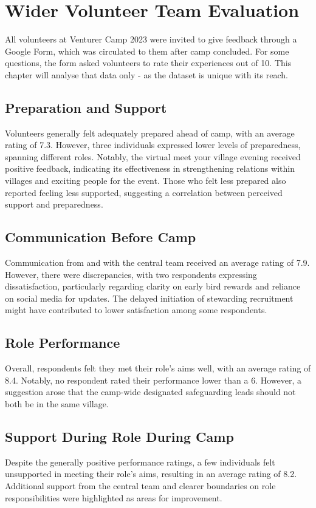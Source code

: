 \chapter{Wider Volunteer Team Evaluation}

All volunteers at Venturer Camp 2023 were invited to give feedback through a Google Form, which was circulated to them after camp concluded. For some questions, the form asked volunteers to rate their experiences out of 10. This chapter will analyse that data only - as the dataset is unique with its reach.

\section{Preparation and Support}
Volunteers generally felt adequately prepared ahead of camp, with an average rating of 7.3. However, three individuals expressed lower levels of preparedness, spanning different roles. Notably, the virtual meet your village evening received positive feedback, indicating its effectiveness in strengthening relations within villages and exciting people for the event. Those who felt less prepared also reported feeling less supported, suggesting a correlation between perceived support and preparedness.

\section{Communication Before Camp}
Communication from and with the central team received an average rating of 7.9. However, there were discrepancies, with two respondents expressing dissatisfaction, particularly regarding clarity on early bird rewards and reliance on social media for updates. The delayed initiation of stewarding recruitment might have contributed to lower satisfaction among some respondents.

\section{Role Performance}
Overall, respondents felt they met their role's aims well, with an average rating of 8.4. Notably, no respondent rated their performance lower than a 6. However, a suggestion arose that the camp-wide designated safeguarding leads should not both be in the same village.

\section{Support During Role During Camp}
Despite the generally positive performance ratings, a few individuals felt unsupported in meeting their role's aims, resulting in an average rating of 8.2. Additional support from the central team and clearer boundaries on role responsibilities were highlighted as areas for improvement.

